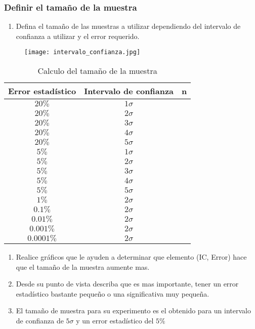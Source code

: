 \documentclass[
]{article}
\providecommand{\tightlist}{%
  \setlength{\itemsep}{0pt}\setlength{\parskip}{0pt}}
\begin{document}
\subsubsection{\texorpdfstring{\textbf{Definir el tamaño de la muestra
}}{Definir el tamaño de la muestra }}\label{definir-el-tamauxf1o-de-la-muestra}

\begin{enumerate}
\def\labelenumi{\arabic{enumi}.}
\tightlist
\item
  Defina el tamaño de las muestras a utilizar dependiendo del intervalo
  de confianza a utilizar y el error requerido.
\end{enumerate}

\begin{figure}
  \centering
  \texttt{[image: intervalo\_confianza.jpg]}
\end{figure}

\begin{table}[ht]
\centering
\caption{Calculo del tamaño de la muestra}
\begin{tabular}{ccc}
Error estadístico & Intervalo de confianza & n \\  \hline
$20\%$ & $1 \sigma$ & \\
$20\%$ & $2 \sigma$ & \\
$20\%$ & $3 \sigma$ & \\
$20\%$ & $4 \sigma$ & \\
$20\%$ & $5 \sigma$ & \\
$5\%$ & $1 \sigma$ & \\
$5\%$ & $2 \sigma$ & \\
$5\%$ & $3 \sigma$ & \\
$5\%$ & $4 \sigma$ & \\
$5\%$ & $5 \sigma$ & \\
$1\%$ & $2 \sigma$ & \\
$0.1\%$ & $2 \sigma$ & \\
$0.01\%$ & $2 \sigma$ & \\
$0.001\%$ & $2 \sigma$ & \\
$0.0001\%$ & $2 \sigma$ & \\
\hline
\end{tabular}
\end{table}

\begin{enumerate}
\def\labelenumi{\arabic{enumi}.}
\setcounter{enumi}{1}
\item
  Realice gráficos que le ayuden a determinar que elemento (IC, Error)
  hace que el tamaño de la muestra aumente mas.
\item
  Desde su punto de vista describa que es mas importante, tener un error
  estadístico bastante pequeño o una significativa muy pequeña.
\item
  El tamaño de muestra para su experimento es el obtenido para un
  intervalo de confianza de \(5 \sigma\) y un error estadístico del
  \(5\%\)
\end{enumerate}
\end{document}
